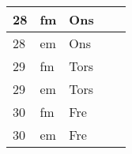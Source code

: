\documentclass[a4paper]{article}
\begin{document}
\begin{table}[ht!]
\begin{tabular}{lllp{7cm}p{7cm}}
\multicolumn{1}{|l|}{28} & \multicolumn{1}{l|}{fm} & \multicolumn{1}{l|}{Ons} & \multicolumn{1}{l|}{} & \multicolumn{1}{l|}{} \\ \hline
\multicolumn{1}{|l|}{28} & \multicolumn{1}{l|}{em} & \multicolumn{1}{l|}{Ons} & \multicolumn{1}{l|}{} & \multicolumn{1}{l|}{} \\ \hline    

\multicolumn{1}{|l|}{29} & \multicolumn{1}{l|}{fm} & \multicolumn{1}{l|}{Tors} & \multicolumn{1}{l|}{} & \multicolumn{1}{l|}{} \\ \hline
\multicolumn{1}{|l|}{29} & \multicolumn{1}{l|}{em} & \multicolumn{1}{l|}{Tors} & \multicolumn{1}{l|}{} & \multicolumn{1}{l|}{} \\ \hline    

\multicolumn{1}{|l|}{30} & \multicolumn{1}{l|}{fm} & \multicolumn{1}{l|}{Fre} & \multicolumn{1}{l|}{} & \multicolumn{1}{l|}{} \\ \hline
\multicolumn{1}{|l|}{30} & \multicolumn{1}{l|}{em} & \multicolumn{1}{l|}{Fre} & \multicolumn{1}{l|}{} & \multicolumn{1}{l|}{} \\ \hline    

    \end{tabular}
    \end{table}
    
\end{document}
